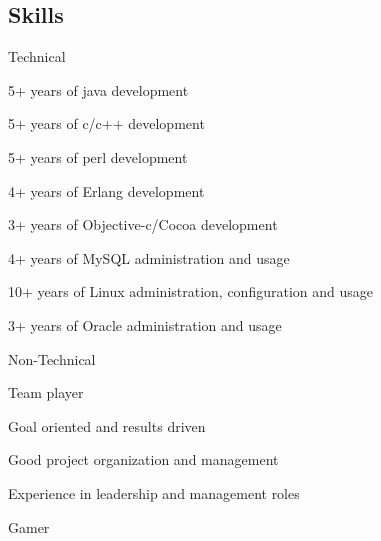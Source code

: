 \documentclass[10pt,letterpaper]{article}
\newenvironment{indentsection}[1]%
{\begin{list}{}%
  {\setlength{\leftmargin}{#1}}%
  \item[]%
}
{\end{list}}
\begin{document}
\vspace{-0.4em}
\subsection*{Skills}

\begin{indentsection}{\parindent}
Technical
\begin{itemize*}
        \item 5+ years of java development
        \item 5+ years of c/c++ development
        \item 5+ years of perl development
        \item 4+ years of Erlang development
        \item 3+ years of Objective-c/Cocoa development
        \item 4+ years of MySQL administration and usage
        \item 10+ years of Linux administration, configuration and usage
        \item 3+ years of Oracle administration and usage
\end{itemize*}
Non-Technical
\begin{itemize*}
        \item Team player
        \item Goal oriented and results driven
        \item Good project organization and management
        \item Experience in leadership and management roles
        \item Gamer
\end{itemize*}

\end{indentsection}
\end{document}
